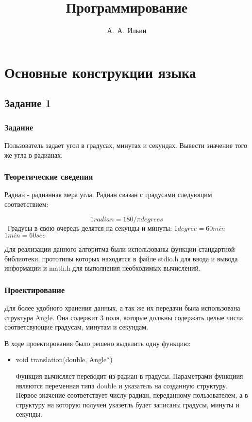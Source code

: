 \documentclass[12pt,a4paper]{report}
\author{А.~А.~Ильин}
\title{Программирование}
\begin{document}
\maketitle
\chapter{Основные конструкции языка}
\section{Задание 1}
\subsection{Задание}

Пользователь задает угол в градусах, минутах и секундах. Вывести значение того же угла в радианах.

\subsection{Теоретические сведения}

Радиан - радианная мера угла. Радиан свазан с градусами следующим соответствием:

\begin{displaymath}1 radian = 180 / \pi degrees \end{displaymath}
\
Градусы в свою очередь делятся на секунды и минуты:
 \begin{math}1 degree = 60 min \end{math} 
 \begin{math}1 min = 60 sec \end{math} 

Для реализации данного алгоритма были использованы функции стандартной библиотеки, прототипы которых находятся в файле stdio.h для ввода и вывода информации и math.h для выполнения необходимых вычислений.


\subsection{Проектирование}
Для более удобного хранения данных, а так же их передачи была использована структура Angle. Она содержит 3 поля, которые должны содержать целые числа, соответсвующие градусам, минутам и секундам.

В ходе проектирования было решено выделить одну функцию:

	\begin{itemize}
	

		\item void translation(double, Angle*)
		
		 Функция вычисляет переводит из радиан в градусы.
		 Параметрами функциия являются переменная типа double и указатель на созданную структуру. Первое значение соответствует числу радиан, переданному пользователем, а в структуру на которую получен указетль будет записаны градусы, минуты и секунды. 
		 				
	\end{itemize}
\end{document}
